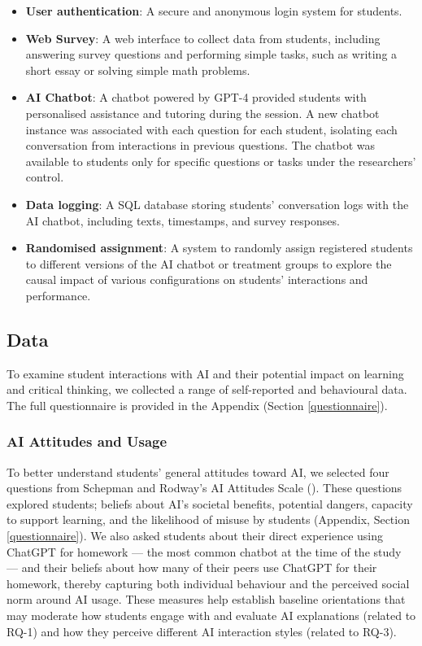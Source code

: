 \documentclass[
  11pt,
]{article}
\providecommand{\tightlist}{%
  \setlength{\itemsep}{0pt}\setlength{\parskip}{0pt}}
\begin{document}
\begin{itemize}
\tightlist
\item
  \textbf{User authentication}: A secure and anonymous login system for students.
\item
  \textbf{Web Survey}: A web interface to collect data from students, including answering survey questions and performing simple tasks, such as writing a short essay or solving simple math problems.
\item
  \textbf{AI Chatbot}: A chatbot powered by GPT-4 provided students with personalised assistance and tutoring during the session. A new chatbot instance was associated with each question for each student, isolating each conversation from interactions in previous questions. The chatbot was available to students only for specific questions or tasks under the researchers' control.
\item
  \textbf{Data logging}: A SQL database storing students' conversation logs with the AI chatbot, including texts, timestamps, and survey responses.
\item
  \textbf{Randomised assignment}: A system to randomly assign registered students to different versions of the AI chatbot or treatment groups to explore the causal impact of various configurations on students' interactions and performance.
\end{itemize}

\subsection{Data}\label{data}

To examine student interactions with AI and their potential impact on learning and critical thinking, we collected a range of self-reported and behavioural data. The full questionnaire is provided in the Appendix (Section \ref{questionnaire}).

\subsubsection{AI Attitudes and Usage}\label{ai-attitudes-and-usage}

To better understand students' general attitudes toward AI, we selected four questions from Schepman and Rodway's AI Attitudes Scale (). These questions explored students; beliefs about AI's societal benefits, potential dangers, capacity to support learning, and the likelihood of misuse by students (Appendix, Section \ref{questionnaire}). We also asked students about their direct experience using ChatGPT for homework --- the most common chatbot at the time of the study --- and their beliefs about how many of their peers use ChatGPT for their homework, thereby capturing both individual behaviour and the perceived social norm around AI usage. These measures help establish baseline orientations that may moderate how students engage with and evaluate AI explanations (related to RQ-1) and how they perceive different AI interaction styles (related to RQ-3).
\end{document}
